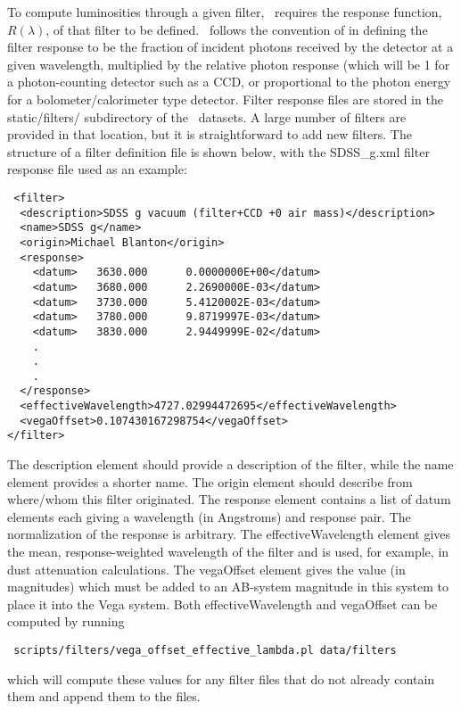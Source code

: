 To compute luminosities through a given filter, \glc\ requires the response function, $R(\lambda)$, of that filter to be defined. \glc\ follows the convention of \cite{hogg_k_2002} in defining the filter response to be the fraction of incident photons received by the detector at a given wavelength, multiplied by the relative photon response (which will be 1 for a photon-counting detector such as a CCD, or proportional to the photon energy for a bolometer/calorimeter type detector. Filter response files are stored in the {\normalfont \ttfamily static/filters/} subdirectory of the \glc\ datasets. A large number of filters are provided in that location, but it is straightforward to add new filters. The structure of a filter definition file is shown below, with the {\normalfont \ttfamily SDSS\_g.xml} filter response file used as an example:
\begin{verbatim}
 <filter>
  <description>SDSS g vacuum (filter+CCD +0 air mass)</description>
  <name>SDSS g</name>
  <origin>Michael Blanton</origin>
  <response>
    <datum>   3630.000      0.0000000E+00</datum>
    <datum>   3680.000      2.2690000E-03</datum>
    <datum>   3730.000      5.4120002E-03</datum>
    <datum>   3780.000      9.8719997E-03</datum>
    <datum>   3830.000      2.9449999E-02</datum>
    .
    .
    . 
  </response>
  <effectiveWavelength>4727.02994472695</effectiveWavelength>
  <vegaOffset>0.107430167298754</vegaOffset>
</filter>
\end{verbatim}
The {\normalfont \ttfamily description} element should provide a description of the filter, while the {\normalfont \ttfamily name} element provides a shorter name. The {\normalfont \ttfamily origin} element should describe from where/whom this filter originated. The {\normalfont \ttfamily response} element contains a list of {\normalfont \ttfamily datum} elements each giving a wavelength (in Angstroms) and response pair. The normalization of the response is arbitrary. The {\normalfont \ttfamily effectiveWavelength} element gives the mean, response-weighted wavelength of the filter and is used, for example, in dust attenuation calculations. The {\normalfont \ttfamily vegaOffset} element gives the value (in magnitudes) which must be added to an AB-system magnitude in this system to place it into the Vega system. Both {\normalfont \ttfamily effectiveWavelength} and {\normalfont \ttfamily vegaOffset} can be computed by running
\begin{verbatim}
 scripts/filters/vega_offset_effective_lambda.pl data/filters
\end{verbatim}
which will compute these values for any filter files that do not already contain them and append them to the files.
